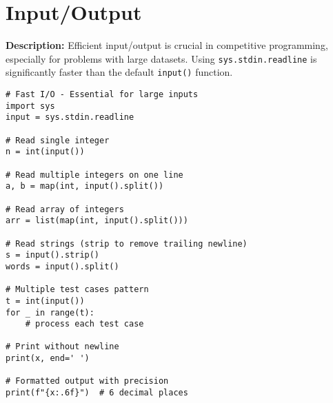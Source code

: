 \section{Input/Output}

\textbf{Description:} Efficient input/output is crucial in competitive programming, especially for problems with large datasets. Using \texttt{sys.stdin.readline} is significantly faster than the default \texttt{input()} function.

\begin{lstlisting}
# Fast I/O - Essential for large inputs
import sys
input = sys.stdin.readline

# Read single integer
n = int(input())

# Read multiple integers on one line
a, b = map(int, input().split())

# Read array of integers
arr = list(map(int, input().split()))

# Read strings (strip to remove trailing newline)
s = input().strip()
words = input().split()

# Multiple test cases pattern
t = int(input())
for _ in range(t):
    # process each test case

# Print without newline
print(x, end=' ')

# Formatted output with precision
print(f"{x:.6f}")  # 6 decimal places
\end{lstlisting}
